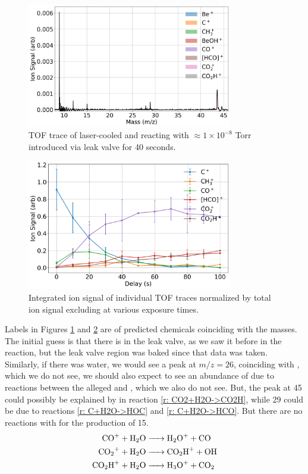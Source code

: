 \begin{figure}
	\label{fig: C+CO2 TOF}
	\centering
	\includegraphics[width=0.8\textwidth]{images/C_CO2_TOF.png}
	\caption{TOF trace of laser-cooled  and  reacting with $\approx 1 \times 10^{-8}$ Torr  introduced via leak valve for 40 seconds.}
\end{figure}

\begin{figure}
	\label{fig: C+CO2 traces}
	\centering
	\includegraphics[width=0.8\textwidth]{images/C_CO2_traces.png}
	\caption{Integrated ion signal of individual TOF traces normalized by total ion signal excluding  at various  exposure times.}
\end{figure}

Labels in Figures \ref{fig: C+CO2 TOF} and \ref{fig: C+CO2 traces} are of predicted chemicals coinciding with the masses. The initial guess is that there is  in the leak valve, as we saw it before in the  reaction, but the leak valve region was baked since that data was taken. Similarly, if there was water, we would see a peak at $m/z=26$, coinciding with , which we do not see, we should also expect to see an abundance of  due to reactions between the alleged \ce{[HCO]+} and , which we also do not see. But, the peak at 45 could possibly be explained by  in reaction \ref{r: CO2+H2O->CO2H}, while 29 could be due to reactions \ref{r: C+H2O->HOC} and \ref{r: C+H2O->HCO}. But there are no reactions with  for the production of 15.
\begin{align}
	\ce{CO+ + H2O & -> H2O+ + CO} \\
	\ce{CO2+ + H2O & -> CO2H+ + OH} \label{r: CO2+H2O->CO2H} \\
	\ce{CO2H+ + H2O & -> H3O+ + CO2}
\end{align}

